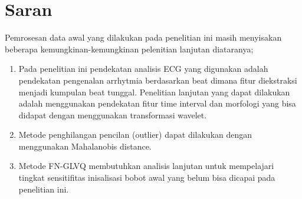 \section{Saran}
Pemrosesan data awal yang dilakukan pada penelitian ini masih menyisakan
beberapa kemungkinan-kemungkinan pelenitian lanjutan diataranya;
\begin{enumerate}
  \item Pada penelitian ini pendekatan analisis ECG yang digunakan adalah
  pendekatan pengenalan arrhytmia berdasarkan beat dimana fitur
  diekstraksi menjadi kumpulan beat tunggal. Penelitian lanjutan yang dapat
  dilakukan adalah menggunakan pendekatan fitur time interval dan
  morfologi yang bisa didapat dengan menggunakan transformasi
  wavelet.
  \item Metode penghilangan pencilan (outlier) dapat dilakukan dengan
  menggunakan Mahalanobis distance.
  \item Metode FN-GLVQ membutuhkan analisis lanjutan untuk mempelajari tingkat
  sensitifitas inisalisasi bobot awal yang belum bisa dicapai pada penelitian
  ini.
\end{enumerate}
